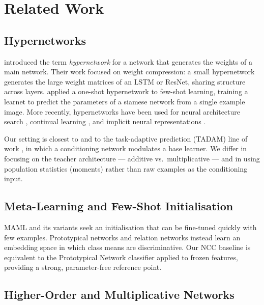 \documentclass{article}
\begin{document}
\section{Related Work}\label{related-work}

\subsection{Hypernetworks}\label{hypernetworks}

\citet{ha2017hypernetworks} introduced the term \emph{hypernetwork} for a network that generates the weights of a main network. Their work focused on weight compression: a small hypernetwork generates the large weight matrices of an LSTM or ResNet, sharing structure across layers. \citet{bertinetto2016learning} applied a one-shot hypernetwork to few-shot learning, training a learnet to predict the parameters of a siamese network from a single example image. More recently, hypernetworks have been used for neural architecture search \citep{brock2018smash}, continual learning \citep{vonoswald2020continual}, and implicit neural representations \citep{sitzmann2020siren}.

Our setting is closest to \citet{bertinetto2016learning} and to the task-adaptive prediction (TADAM) line of work \citep{oreshkin2018tadam}, in which a conditioning network modulates a base learner. We differ in focusing on the teacher architecture --- additive vs.~multiplicative --- and in using population statistics (moments) rather than raw examples as the conditioning input.

\subsection{Meta-Learning and Few-Shot Initialisation}\label{meta-learning-and-few-shot-initialisation}

MAML \citep{finn2017maml} and its variants \citep{nichol2018firstorder,rajeswaran2019implicit} seek an initialisation that can be fine-tuned quickly with few examples. Prototypical networks \citep{snell2017prototypical} and relation networks \citep{sung2018relation} instead learn an embedding space in which class means are discriminative. Our NCC baseline is equivalent to the Prototypical Network classifier applied to frozen features, providing a strong, parameter-free reference point.

\subsection{Higher-Order and Multiplicative Networks}\label{higher-order-and-multiplicative-networks}
\end{document}
